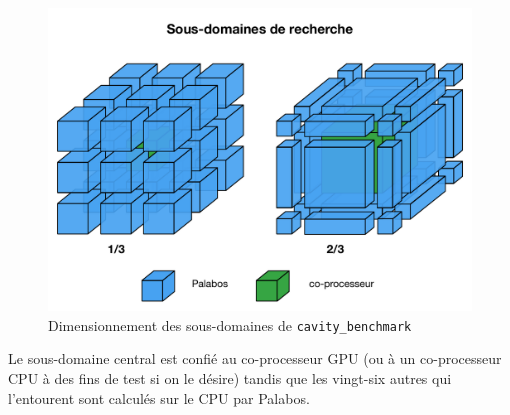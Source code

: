 \begin{figure}[H]
	\centering
	\includegraphics[scale=0.65, fbox]{images/decoupage_sous_domaine_cavity_benchmark.pdf}
	\caption{Dimensionnement des sous-domaines de \texttt{cavity\_benchmark}}
	\label{fig:decoupage_sous_domaine_cavity_benchmark}
\end{figure}

Le sous-domaine central est confié au co-processeur \acs{GPU} (ou à un co-processeur \acs{CPU} à des fins de test si on le désire) tandis que les vingt-six autres qui l'entourent sont calculés sur le \acs{CPU} par Palabos.

